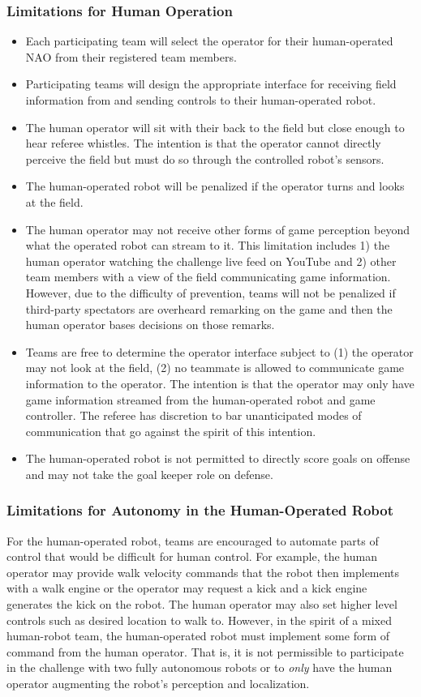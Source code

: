 \subsubsection{Limitations for Human Operation}
\begin{itemize}
	\item Each participating team will select the operator for their human-operated NAO from their registered team members.
	\item Participating teams will design the appropriate interface for receiving field information from and sending controls to their human-operated robot.
	\item The human operator will sit with their back to the field but close enough to hear referee whistles. The intention is that the operator cannot directly perceive the field but must do so through the controlled robot’s sensors.
	\item The human-operated robot will be penalized if the operator turns and looks at the field.
	\item The human operator may not receive other forms of game perception beyond what the operated robot can stream to it. This limitation includes 1) the human operator watching the challenge live feed on YouTube and 2) other team members with a view of the field communicating game information. However, due to the difficulty of prevention, teams will not be penalized if third-party spectators are overheard remarking on the game and then the human operator bases decisions on those remarks.
	\item Teams are free to determine the operator interface subject to (1) the operator may not look at the field, (2) no teammate  is allowed to communicate game information to the operator. The intention is that the operator may only have game information streamed from the human-operated robot and game controller. The referee has discretion to bar unanticipated modes of communication that go against the spirit of this intention. 
	\item The human-operated robot is not permitted to directly score goals on offense and may not take the goal keeper role on defense.
\end{itemize}

\subsubsection{Limitations for Autonomy in the Human-Operated Robot}

For the human-operated robot, teams are encouraged to automate parts of control that would be difficult for human control. For example, the human operator may provide walk velocity commands that the robot then implements with a walk engine or the operator may request a kick and a kick engine generates the kick on the robot. The human operator may also set higher level controls such as desired location to walk to. However, in the spirit of a mixed human-robot team, the human-operated robot must implement some form of command from the human operator. That is, it is not permissible to participate in the challenge with two fully autonomous robots or to \textit{only} have the human operator augmenting the robot's perception and localization. 

